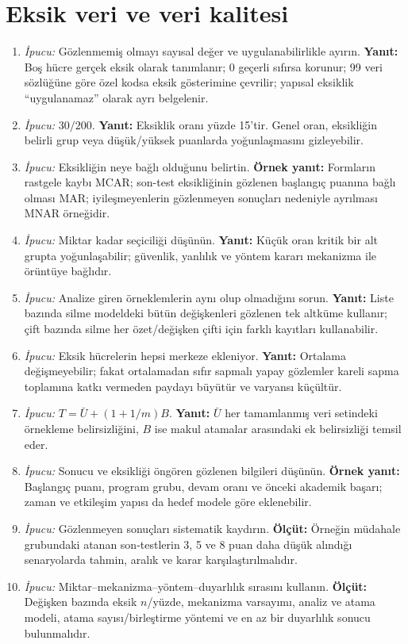 \section{Eksik veri ve veri kalitesi}

\begin{enumerate}[leftmargin=*,itemsep=5pt]
\item \emph{İpucu:} Gözlenmemiş olmayı sayısal değer ve uygulanabilirlikle ayırın.
\textbf{Yanıt:} Boş hücre gerçek eksik olarak tanımlanır; 0 geçerli sıfırsa
korunur; 99 veri sözlüğüne göre özel kodsa eksik gösterimine çevrilir; yapısal
eksiklik ``uygulanamaz'' olarak ayrı belgelenir.
\item \emph{İpucu:} $30/200$. \textbf{Yanıt:} Eksiklik oranı yüzde 15'tir.
Genel oran, eksikliğin belirli grup veya düşük/yüksek puanlarda yoğunlaşmasını
gizleyebilir.
\item \emph{İpucu:} Eksikliğin neye bağlı olduğunu belirtin.
\textbf{Örnek yanıt:} Formların rastgele kaybı MCAR; son-test eksikliğinin
gözlenen başlangıç puanına bağlı olması MAR; iyileşmeyenlerin gözlenmeyen
sonuçları nedeniyle ayrılması MNAR örneğidir.
\item \emph{İpucu:} Miktar kadar seçiciliği düşünün.
\textbf{Yanıt:} Küçük oran kritik bir alt grupta yoğunlaşabilir; güvenlik,
yanlılık ve yöntem kararı mekanizma ile örüntüye bağlıdır.
\item \emph{İpucu:} Analize giren örneklemlerin aynı olup olmadığını sorun.
\textbf{Yanıt:} Liste bazında silme modeldeki bütün değişkenleri gözlenen tek
altküme kullanır; çift bazında silme her özet/değişken çifti için farklı
kayıtları kullanabilir.
\item \emph{İpucu:} Eksik hücrelerin hepsi merkeze ekleniyor.
\textbf{Yanıt:} Ortalama değişmeyebilir; fakat ortalamadan sıfır sapmalı yapay
gözlemler kareli sapma toplamına katkı vermeden paydayı büyütür ve varyansı
küçültür.
\item \emph{İpucu:} $T=\bar U+(1+1/m)B$.
\textbf{Yanıt:} $\bar U$ her tamamlanmış veri setindeki örnekleme belirsizliğini,
$B$ ise makul atamalar arasındaki ek belirsizliği temsil eder.
\item \emph{İpucu:} Sonucu ve eksikliği öngören gözlenen bilgileri düşünün.
\textbf{Örnek yanıt:} Başlangıç puanı, program grubu, devam oranı ve önceki
akademik başarı; zaman ve etkileşim yapısı da hedef modele göre eklenebilir.
\item \emph{İpucu:} Gözlenmeyen sonuçları sistematik kaydırın.
\textbf{Ölçüt:} Örneğin müdahale grubundaki atanan son-testlerin 3, 5 ve 8 puan
daha düşük alındığı senaryolarda tahmin, aralık ve karar karşılaştırılmalıdır.
\item \emph{İpucu:} Miktar--mekanizma--yöntem--duyarlılık sırasını kullanın.
\textbf{Ölçüt:} Değişken bazında eksik $n$/yüzde, mekanizma varsayımı, analiz
ve atama modeli, atama sayısı/birleştirme yöntemi ve en az bir duyarlılık
sonucu bulunmalıdır.
\end{enumerate}

